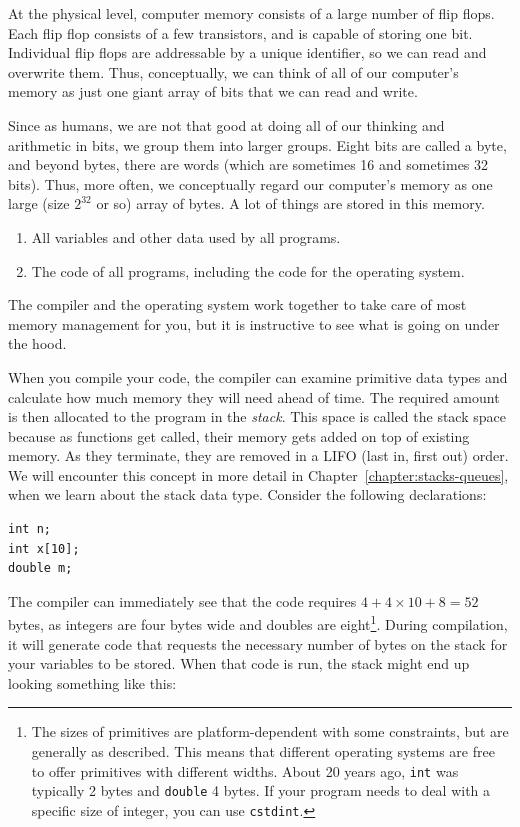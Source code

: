 At the physical level, computer memory consists of a large number of flip flops.
Each flip flop consists of a few transistors, and is capable of storing one bit.
Individual flip flops are addressable by a unique identifier, so we can read and overwrite them. 
Thus, conceptually, we can think of all of our computer's memory as just one giant array of bits that we can read and write.

Since as humans, we are not that good at doing all of our thinking and arithmetic in bits, we group them into larger groups.
Eight bits are called a byte, and beyond bytes, there are words (which are sometimes 16 and sometimes 32 bits).
Thus, more often, we conceptually regard our computer's memory as one large (size $2^{32}$ or so) array of bytes.
A lot of things are stored in this memory.

\begin{enumerate}
\item All variables and other data used by all programs.
\item The code of all programs, including the code for the operating system.
\end{enumerate}

The compiler and the operating system work together to take care of most memory management for you, but it is instructive to see what is going on under the hood.

When you compile your code, the compiler can examine primitive data types and calculate how much memory they will need ahead of time.
The required amount is then allocated to the program in the \emph{stack}.
This space is called the stack space because as functions get called, their memory gets added on top of existing memory.
As they terminate, they are removed in a LIFO (last in, first out) order.
We will encounter this concept in more detail in Chapter~\ref{chapter:stacks-queues}, when we learn about the stack data type.
Consider the following declarations: 

\begin{verbatim}
int n;
int x[10];
double m;
\end{verbatim}

The compiler can immediately see that the code requires $4+4\times10+8=52$ bytes, as integers are four bytes wide and doubles are eight\footnote{
The sizes of primitives are platform-dependent with some constraints, but are generally as described.
This means that different operating systems are free to offer primitives with different widths.
About 20 years ago, \texttt{int} was typically 2 bytes and \texttt{double} 4 bytes.
If your program needs to deal with a specific size of integer, you can use \texttt{cstdint}.}.
During compilation, it will generate code that requests the necessary number of bytes on the stack for your variables to be stored.
When that code is run, the stack might end up looking something like this:

